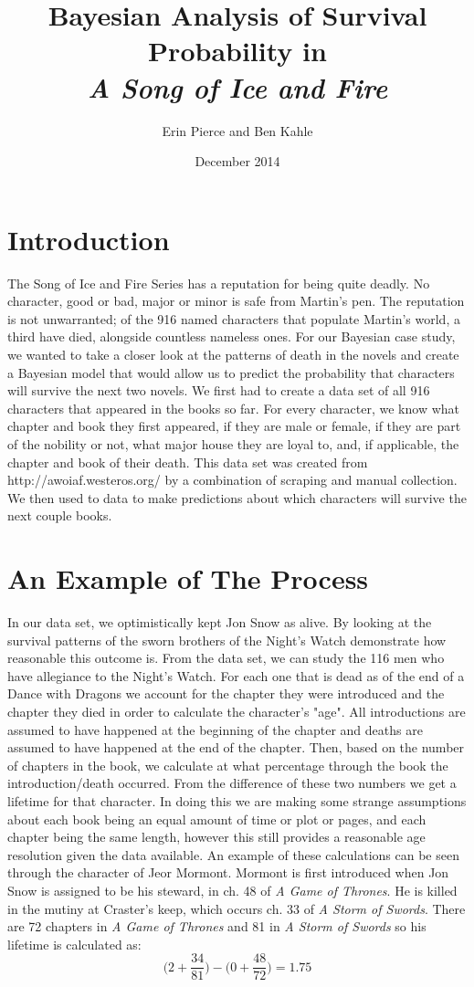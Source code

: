 \documentclass{article}
\title{Bayesian Analysis of Survival Probability in \\ \textit{A Song of Ice and Fire}}
\author{Erin Pierce and Ben Kahle}
\date{December 2014}
\begin{document}
\maketitle

\section{Introduction}


The Song of Ice and Fire Series has a reputation for being quite deadly.  No character, good or bad, major or minor is safe from Martin's pen.  The reputation is not unwarranted; of the 916 named characters that populate Martin's world, a third have died, alongside countless nameless ones. For our Bayesian case study, we wanted to take a closer look at the patterns of death in the novels and create a Bayesian model that would allow us to predict the probability that characters will survive the next two novels. We first had to create a data set of all 916 characters that appeared in the books so far.  For every character, we know what chapter and book they first appeared, if they are male or female, if they are part of the nobility or not, what major house they are loyal to, and, if applicable, the chapter and book of their death. This data set was created from http://awoiaf.westeros.org/ by a combination of scraping and manual collection. We then used to data to make predictions about which characters will survive the next couple books.

\section{An Example of The Process}

In our data set, we optimistically kept Jon Snow as alive. By looking at the survival patterns of the sworn brothers of the Night's Watch demonstrate how reasonable this outcome is.  From the data set, we can study the 116 men who have allegiance to the Night's Watch.  For each one that is dead as of the end of a Dance with Dragons we account for the chapter they were introduced and the chapter they died in order to calculate the character's "age". All introductions are assumed to have happened at the beginning of the chapter and deaths are assumed to have happened at the end of the chapter.  Then, based on the number of chapters in the book, we calculate at what percentage through the book the introduction/death occurred.  From the difference of these two numbers we get a lifetime for that character.  In doing this we are making some strange assumptions about each book being an equal amount of time or plot or pages, and each chapter being the same length, however this still provides a reasonable age resolution given the data available. An example of these calculations can be seen through the character of Jeor Mormont.  Mormont is first introduced when Jon Snow is assigned to be his steward, in ch. 48 of \textit{A Game of Thrones}.  He is killed in the mutiny at Craster's keep, which occurs ch. 33 of \textit{A Storm of Swords}. There are 72 chapters in \textit{A Game of Thrones} and 81 in \textit{A Storm of Swords} so his lifetime is calculated as:
$$
\bigg( 2+ \frac{34}{81} \bigg) - \bigg(0+\frac{48}{72}\bigg) = 1.75
$$
\end{document}
